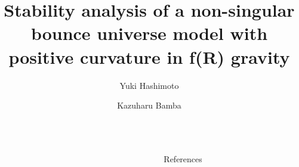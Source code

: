 \documentclass[final]{beamer}
\title{Stability analysis of a non-singular bounce universe model with positive curvature in f(R) gravity}
\author{Yuki Hashimoto \and Kazuharu Bamba}
\institute[shortinst]{Fukushima University}
\newlength{\sepwidth}
\newlength{\colwidth}
\newcommand{\separatorcolumn}{\begin{column}{\sepwidth}\end{column}}
\begin{document}
        \begin{frame}[t]
                \begin{columns}[t]
                        \separatorcolumn
                        \begin{column}{\colwidth}
                                
                                
                        \end{column}
                        \separatorcolumn
                        \begin{column}{\colwidth}
                                
                                
                                \begin{block}{References}
                                        \nocite{*}
                                        \footnotesize{\printbibliography}
                                \end{block}
                        \end{column}
                        \separatorcolumn
                \end{columns}
        \end{frame}
\end{document}
